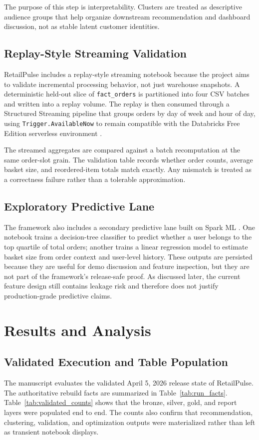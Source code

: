 \documentclass[journal]{IEEEtran}
\begin{document}
The purpose of this step is interpretability. Clusters are treated as descriptive audience groups that help organize downstream recommendation and dashboard discussion, not as stable latent customer identities.

\subsection{Replay-Style Streaming Validation}
RetailPulse includes a replay-style streaming notebook because the project aims to validate incremental processing behavior, not just warehouse snapshots. A deterministic held-out slice of \texttt{fact\_orders} is partitioned into four CSV batches and written into a replay volume. The replay is then consumed through a Structured Streaming pipeline that groups orders by day of week and hour of day, using \texttt{Trigger.AvailableNow} to remain compatible with the Databricks Free Edition serverless environment \cite{armbrust2018structured,databricks_streaming}.

The streamed aggregates are compared against a batch recomputation at the same order-slot grain. The validation table records whether order counts, average basket size, and reordered-item totals match exactly. Any mismatch is treated as a correctness failure rather than a tolerable approximation.

\subsection{Exploratory Predictive Lane}
The framework also includes a secondary predictive lane built on Spark ML \cite{spark_ml}. One notebook trains a decision-tree classifier to predict whether a user belongs to the top quartile of total orders; another trains a linear regression model to estimate basket size from order context and user-level history. These outputs are persisted because they are useful for demo discussion and feature inspection, but they are not part of the framework's release-safe proof. As discussed later, the current feature design still contains leakage risk and therefore does not justify production-grade predictive claims.

\section{Results and Analysis}
\subsection{Validated Execution and Table Population}
The manuscript evaluates the validated April 5, 2026 release state of RetailPulse. The authoritative rebuild facts are summarized in Table~\ref{tab:run_facts}. Table~\ref{tab:validated_counts} shows that the bronze, silver, gold, and report layers were populated end to end. The counts also confirm that recommendation, clustering, validation, and optimization outputs were materialized rather than left as transient notebook displays.
\end{document}
